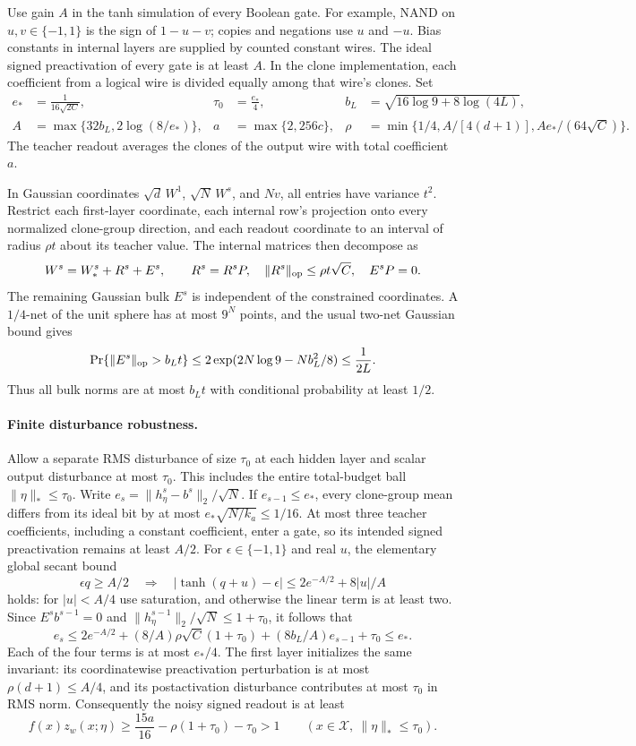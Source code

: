 \documentclass[11pt]{article}
\begin{document}
Use gain $A$ in the tanh simulation of every Boolean gate. For example,
NAND on $u,v\in\{-1,1\}$ is the sign of $1-u-v$; copies and negations
use $u$ and $-u$. Bias constants in internal layers are supplied by counted
constant wires. The ideal signed preactivation of every gate is at least
$A$. In the clone implementation, each coefficient from a logical wire is
divided equally among that wire's clones. Set
\begin{align*}
 e_*&=\frac1{16\sqrt{2C}},&
 \tau_0&=\frac{e_*}{4},&
 b_L&=\sqrt{16\log9+8\log(4L)},\\
 A&=\max\{32b_L,2\log(8/e_*)\},&
 a&=\max\{2,256c\},&
 \rho&=\min\{1/4,A/[4(d+1)],Ae_*/(64\sqrt C)\}.
\end{align*}
The teacher readout averages the clones of the output wire with total
coefficient $a$.

In Gaussian coordinates $\sqrt d\,W^1$, $\sqrt N\,W^s$, and $Nv$, all
entries have variance $t^2$. Restrict each first-layer coordinate, each
internal row's projection onto every normalized clone-group direction, and
each readout coordinate to an interval of radius $\rho t$ about its teacher
value. The internal matrices then decompose as
\[
 W^s=W_*^s+R^s+E^s,\qquad
 R^s=R^sP,\quad \|R^s\|_{\rm op}\le\rho t\sqrt C,
 \quad E^sP=0.
\]
The remaining Gaussian bulk $E^s$ is independent of the constrained
coordinates. A $1/4$-net of the unit sphere has at most $9^N$ points,
and the usual two-net Gaussian bound gives
\[
 \Pr\{\|E^s\|_{\rm op}>b_Lt\}
 \le2\exp(2N\log9-Nb_L^2/8)\le\frac1{2L}.
\]
Thus all bulk norms are at most $b_Lt$ with conditional probability at
least $1/2$.

\paragraph{Finite disturbance robustness.}
Allow a separate RMS disturbance of size $\tau_0$ at each hidden layer and
scalar output disturbance at most $\tau_0$. This includes the entire
total-budget ball $\|\eta\|_*\le\tau_0$.
Write $e_s=\|h^s_\eta-b^s\|_2/\sqrt N$.
If $e_{s-1}\le e_*$, every clone-group mean differs from its ideal bit by
at most $e_*\sqrt{N/k_a}\le1/16$. At most three teacher coefficients,
including a constant coefficient, enter a gate, so its intended signed
preactivation remains at least $A/2$.
For $\epsilon\in\{-1,1\}$ and real $u$, the elementary global secant bound
\[
 \epsilon q\ge A/2
 \quad\Longrightarrow\quad
 |\tanh(q+u)-\epsilon|\le2e^{-A/2}+8|u|/A
\]
holds: for $|u|<A/4$ use saturation, and otherwise the linear term is at
least two. Since $E^sb^{s-1}=0$ and
$\|h^{s-1}_\eta\|_2/\sqrt N\le1+\tau_0$, it follows that
\[
 e_s\le2e^{-A/2}+
          (8/A)\rho\sqrt C(1+\tau_0)
          +(8b_L/A)e_{s-1}+\tau_0\le e_*.
\]
Each of the four terms is at most $e_*/4$.
The first layer initializes the same invariant: its coordinatewise
preactivation perturbation is at most $\rho(d+1)\le A/4$, and its
postactivation disturbance contributes at most $\tau_0$ in RMS norm.
Consequently the noisy signed readout is at least
\[
 f(x)z_w(x;\eta)
 \ge\frac{15a}{16}-\rho(1+\tau_0)-\tau_0>1
 \qquad(x\in\mathcal X,\ \|\eta\|_*\le\tau_0).
\]
\end{document}
